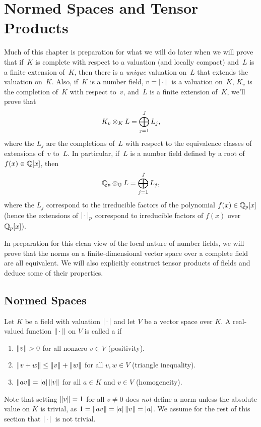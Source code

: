 \chapter{Normed Spaces and Tensor Products}
Much of this chapter is preparation for what we will do later
when we will prove that if~$K$ is complete with respect to a valuation
(and locally compact) and~$L$ is a finite extension of~$K$, then there
is a {\em unique} valuation on~$L$ that extends the valuation on~$K$.
Also, if~$K$ is a number field, $v=\left|\,\cdot\,\right|{}$ is a valuation on~$K$,
$K_v$ is the completion of~$K$ with respect to~$v$, and~$L$ is a
finite extension of~$K$, we'll prove that
$$
 K_v \otimes_K L   = \bigoplus_{j=1}^J L_j,
 $$
 where the $L_j$ are the completions of~$L$ with respect to the
 equivalence classes of extensions of~$v$ to~$L$.  In particular,
 if~$L$ is a number field defined by a root of $f(x)\in \mathbb{Q}[x]$, then
$$
  \mathbb{Q}_p  \otimes_{\mathbb{Q}}  L = \bigoplus_{j=1}^J L_j,
$$
 where the $L_j$ correspond to the irreducible factors of
 the polynomial $f(x) \in \mathbb{Q}_p[x]$ (hence the extensions of 
$\left|\,\cdot\,\right|_p$ correspond to irreducible factors of $f(x)$
over $\mathbb{Q}_p[x]$).  

In preparation for this clean view of the local nature of number
fields, we will prove that the norms on a finite-dimensional
vector space over a complete field are all equivalent.  We will also
explicitly construct tensor products of fields and deduce some of
their properties.

\section{Normed Spaces}
\begin{definition}[Norm]\label{defn:norm} 
Let $K$ be a field with valuation $\left|\,\cdot\,\right|$ and let $V$ be a vector space 
over $K$.  A real-valued function $\left\|\,\cdot\,\right\|$ on $V$ is called a  if 
\begin{enumerate}
\item $\norm{v}>0$ for all nonzero $v\in V$ (positivity).
\item $\left\|v+w\right\| \leq \left\|v\right\| + \left\|w\right\|$ for all $v,w\in V$ (triangle inequality). 
\item $\left\|av\right\| = \left|a\right|\left\|v\right\|$ for all $a\in K$ and $v\in V$ (homogeneity).
\end{enumerate} 
\end{definition}
Note that setting $\left\|v\right\|=1$ for all $v\neq 0$ does {\em not} define
a norm unless the absolute value on $K$ is trivial, as $1=\left\|av\right\| =
\left|a\right|\left\|v\right\|=\left|a\right|$.  We assume for the rest of this section
that $\left|\,\cdot\,\right|{}$ is not trivial.

